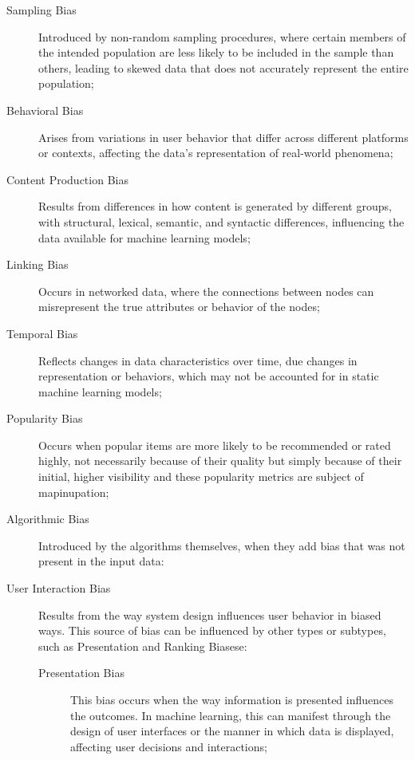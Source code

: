 \begin{description}
    \item[Sampling Bias] Introduced by non-random sampling procedures, where certain members of the intended population are less likely to be included in the sample than others, leading to skewed data that does not accurately represent the entire population;
    
    \item[Behavioral Bias] Arises from variations in user behavior that differ across different platforms or contexts, affecting the data's representation of real-world phenomena;

    \item[Content Production Bias] Results from differences in how content is generated by different groups, with structural, lexical, semantic, and syntactic differences, influencing the data available for machine learning models; 

    \item[Linking Bias] Occurs in networked data, where the connections between nodes can misrepresent the true attributes or behavior of the nodes;

    \item[Temporal Bias] Reflects changes in data characteristics over time, due changes in representation or behaviors, which may not be accounted for in static machine learning models;
    
    \item[Popularity Bias] Occurs when popular items are more likely to be recommended or rated highly, not necessarily because of their quality but simply because of their initial, higher visibility and these popularity metrics are subject of mapinupation;

    \item[Algorithmic Bias] Introduced by the algorithms themselves, when they add bias that was not present in the input data:

    \item[User Interaction Bias] Results from the way system design influences user behavior in biased ways. This source of bias can be influenced by other types or subtypes, such as Presentation and Ranking Biasese:
    \begin{description}
        \item[Presentation Bias] This bias occurs when the way information is presented influences the outcomes. In machine learning, this can manifest through the design of user interfaces or the manner in which data is displayed, affecting user decisions and interactions;


\end{description}
\end{description}

